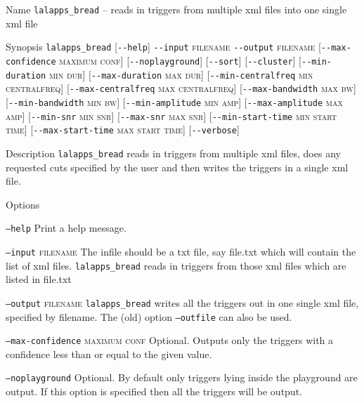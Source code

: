 \begin{entry}
\item[Name]
\verb$lalapps_bread$ -- reads in triggers from multiple xml files into one single xml file 

\item[Synopsis]
\verb$lalapps_bread$ 
[\verb$--help$]
\verb$--input$ \textsc{filename} 
\verb$--output$ \textsc{filename} 
[\verb$--max-confidence$ \textsc{maximum conf}]
[\verb$--noplayground$]
[\verb$--sort$]
[\verb$--cluster$]
[\verb$--min-duration$ \textsc{min dur}]
[\verb$--max-duration$ \textsc{max dur}]
[\verb$--min-centralfreq$ \textsc{min centralfreq}]
[\verb$--max-centralfreq$ \textsc{max centralfreq}]
[\verb$--max-bandwidth$ \textsc{max bw}]
[\verb$--min-bandwidth$ \textsc{min bw}]
[\verb$--min-amplitude$ \textsc{min amp}]
[\verb$--max-amplitude$ \textsc{max amp}]
[\verb$--min-snr$ \textsc{min snr}]
[\verb$--max-snr$ \textsc{max snr}]
[\verb$--min-start-time$ \textsc{min start time}]
[\verb$--max-start-time$ \textsc{max start time}]
[\verb$--verbose$]

\item[Description] 
\verb$lalapps_bread$
reads in triggers from multiple xml files, does any requested cuts
specified by the user and then writes the triggers in a single xml 
file.  

\item[Options]\leavevmode
\begin{entry}
\item[\texttt{--help}] Print a help message.

\item[\texttt{--input} \textsc{filename}]
The infile should be a txt file, say file.txt which
will contain the list of xml files. \verb$lalapps_bread$ reads 
in triggers from those xml files which are listed in file.txt

\item[\texttt{--output} \textsc{filename}]
\verb$lalapps_bread$ writes all the triggers out in one single xml file, specified by filename.  The (old) option \texttt{--outfile} can also be used.

\item[\texttt{--max-confidence} \textsc{maximum conf}]
Optional. Outputs only the triggers with a confidence less than or equal to the given value.

\item[\texttt{--noplayground}]
Optional. By default only triggers lying inside the playground are output. If this option is 
specified then all the triggers will be output. 


\end{entry}
\end{entry}
